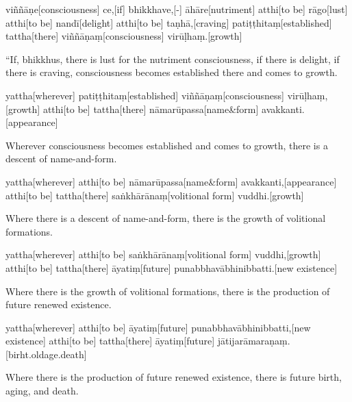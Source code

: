 \vskip 0.2in
\begin{samepage}
\begingl[glneveryline={\PaliGlossA,\PaliGlossB}]
viññāṇe[consciousness] ce,[if] bhikkhave,[-] āhāre[nutriment] atthi[to be] rāgo[lust] atthi[to be] nandī[delight] atthi[to be] taṇhā,[craving] patiṭṭhitaṃ[established] tattha[there] viññāṇaṃ[consciousness] virūḷhaṃ.[growth]
\endgl
\nopagebreak
\linespread{0.5}
\begin{spacin}{0.2}
{\PaliGlossFT “If, bhikkhus, there is lust for the nutriment consciousness, if there is delight, if there is craving, consciousness becomes established there and comes to growth.}
\end{spacin}
\vskip 12pt
\end{samepage}
\begin{samepage}
\begingl[glneveryline={\PaliGlossA,\PaliGlossB}]
yattha[wherever] patiṭṭhitaṃ[established] viññāṇaṃ[consciousness] virūḷhaṃ,[growth] atthi[to be] tattha[there] nāmarūpassa[name\&form] avakkanti.[appearance]
\endgl
\nopagebreak
\linespread{0.5}
\begin{spacin}{0.2}
{\PaliGlossFT Wherever consciousness becomes established and comes to growth, there is a descent of name-and-form.}
\end{spacin}
\vskip 12pt
\end{samepage}
\begin{samepage}
\begingl[glneveryline={\PaliGlossA,\PaliGlossB}]
yattha[wherever] atthi[to be] nāmarūpassa[name\&form] avakkanti,[appearance] atthi[to be] tattha[there] saṅkhārānaṃ[volitional form] vuddhi.[growth]
\endgl
\nopagebreak
\linespread{0.5}
\begin{spacin}{0.2}
{\PaliGlossFT Where there is a descent of name-and-form, there is the growth of volitional formations.}
\end{spacin}
\vskip 12pt
\end{samepage}
\begin{samepage}
\begingl[glneveryline={\PaliGlossA,\PaliGlossB}]
yattha[wherever] atthi[to be] saṅkhārānaṃ[volitional form] vuddhi,[growth] atthi[to be] tattha[there] āyatiṃ[future] punabbhavābhinibbatti.[new existence]
\endgl
\nopagebreak
\linespread{0.5}
\begin{spacin}{0.2}
{\PaliGlossFT Where there is the growth of volitional formations, there is the production of future renewed existence.}
\end{spacin}
\vskip 12pt
\end{samepage}
\begin{samepage}
\begingl[glneveryline={\PaliGlossA,\PaliGlossB}]
yattha[wherever] atthi[to be] āyatiṃ[future] punabbhavābhinibbatti,[new existence] atthi[to be] tattha[there] āyatiṃ[future] jātijarāmaraṇaṃ.[birht.oldage.death]
\endgl
\nopagebreak
\linespread{0.5}
\begin{spacin}{0.2}
{\PaliGlossFT Where there is the production of future renewed existence, there is future birth, aging, and death.}
\end{spacin}
\vskip 12pt
\end{samepage}
